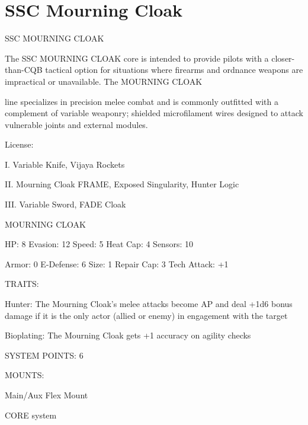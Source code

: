 \section{SSC Mourning Cloak}

                                    SSC MOURNING CLOAK  

The SSC MOURNING CLOAK core is intended to provide pilots with a closer-than-CQB tactical option for  
situations where firearms and ordnance weapons are impractical or unavailable. The MOURNING CLOAK  

line specializes in precision melee combat and is commonly outfitted with a complement of variable  
weaponry; shielded microfilament wires designed to attack vulnerable joints and external modules. 
 

                                                  License:
 
I. Variable Knife, Vijaya Rockets
 
II. Mourning Cloak FRAME, Exposed Singularity, Hunter Logic
 
III. Variable Sword, FADE Cloak
 

                                           MOURNING CLOAK 

  HP: 8          Evasion: 12                          Speed: 5           Heat Cap: 4        Sensors: 10 

  Armor: 0       E-Defense: 6                         Size: 1            Repair Cap: 3      Tech Attack:  
                                                                                            +1 

                                                   TRAITS: 

  Hunter: The Mourning Cloak’s melee attacks become AP and deal +1d6 bonus damage if it is the only  
  actor (allied or enemy) in engagement with the target
 
  Bioplating: The Mourning Cloak gets +1 accuracy on agility checks 

                                             SYSTEM POINTS: 6 

                                                  MOUNTS: 

  Main/Aux                                             Flex Mount 

                                                CORE system 

                                                                                                           


